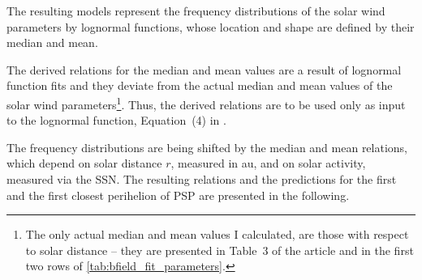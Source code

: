 The resulting models represent the frequency distributions of the solar wind parameters by lognormal functions, whose location and shape are defined by their median and mean.

The derived relations for the median and mean values are a result of lognormal function fits and they deviate from the actual median and mean values of the solar wind parameters\footnote{The only actual median and mean values I calculated, are those with respect to solar distance -- they are presented in Table~3 of the article and in the first two rows of \autoref{tab:bfield_fit_parameters}.}. Thus, the derived relations are to be used only as input to the lognormal function, Equation~(4) in \citet{Venzmer2018}.

The frequency distributions are being shifted by the median and mean relations, which depend on solar distance $r$, measured in au, and on solar activity, measured via the SSN. The resulting relations and the predictions for the first and the first closest perihelion of PSP are presented in the following.
